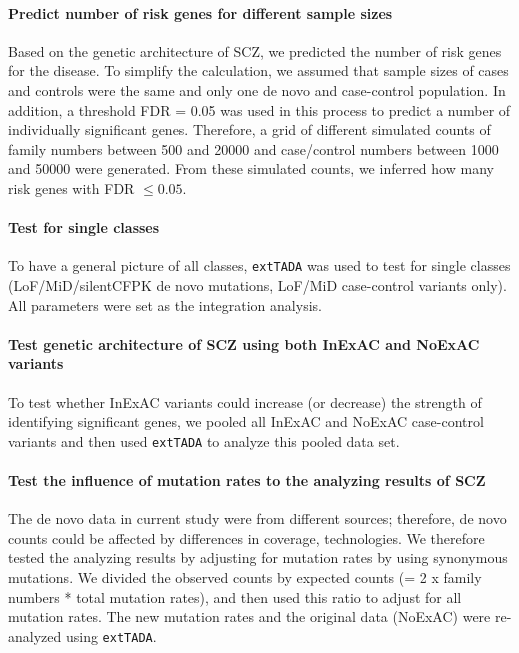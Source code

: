 \documentclass[]{article}
\begin{document}
\paragraph{Predict number of risk genes for different sample sizes}

Based on the genetic architecture of SCZ, we predicted the number of
risk genes for the disease. To simplify the calculation, we assumed
that sample sizes of cases and controls were the same and only one de
novo and case-control population. In addition, a
 threshold FDR = 0.05 was used in this process to predict a number of
 individually significant genes. Therefore, a
grid of different simulated counts of family numbers between 500 and
20000 and case/control numbers between 1000 and 50000 were
generated. From these simulated counts, we inferred how many risk
genes with FDR $\le 0.05$.

\paragraph{Test for single classes}

To have a general picture of all classes, \texttt{extTADA} was used to test for single classes (LoF/MiD/silentCFPK de
novo mutations, LoF/MiD case-control variants only). All parameters were set as the
integration analysis.

\paragraph{Test genetic architecture of SCZ using both InExAC and
  NoExAC variants}

To test whether InExAC variants could increase (or decrease) the
strength of identifying significant genes, we pooled all InExAC and
NoExAC case-control variants and then used \texttt{extTADA} to analyze this pooled
data set.


\paragraph{Test the influence of mutation rates to the analyzing
  results of SCZ}

The de novo data in current study were from different sources;
therefore, de novo counts could be affected by differences in coverage, technologies.
We therefore tested the analyzing results by adjusting for mutation
rates by using synonymous mutations. We divided the observed counts by
expected counts (= 2 x family numbers * total mutation rates), and
then used this ratio to adjust for all mutation rates. The new
mutation rates and the original data (NoExAC) were re-analyzed using \texttt{extTADA}.
\end{document}
